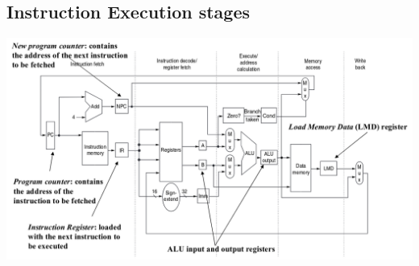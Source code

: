 \subsection{Instruction Execution stages}
\includegraphics[width=\textwidth]{images/mips_scheme.png}

